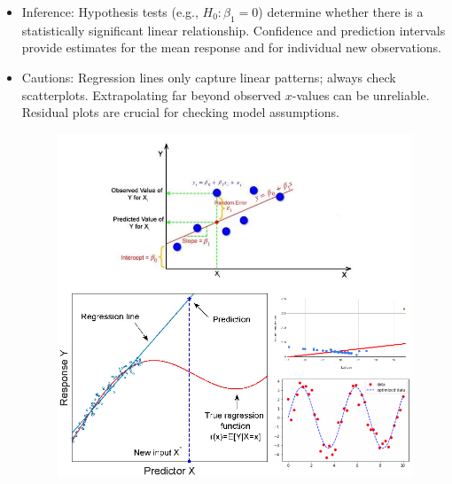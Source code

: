 \documentclass[twoside]{article}
\newcommand{\0}{\mathbf{0}}
\begin{document}
\begin{itemize}
\item Inference:
\subitem Hypothesis tests (e.g., \(H_0: \beta_1 = 0\)) determine whether there is a statistically significant linear relationship. Confidence and prediction intervals provide estimates for the mean response and for individual new observations.
\item Cautions:
\subitem Regression lines only capture linear patterns; always check scatterplots.
\subitem Extrapolating far beyond observed \(x\)-values can be unreliable.
\subitem Residual plots are crucial for checking model assumptions.
\begin{figure}[h]
\begin{center}
\includegraphics[angle=0, width=\textwidth] {regression.png}
\end{center}
\end{figure}
\end{itemize}
\end{document}
